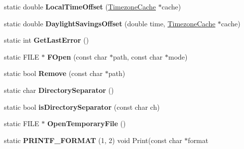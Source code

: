 \begin{DoxyCompactItemize}
\item 
static double {\bfseries Local\+Time\+Offset} (\hyperlink{classv8_1_1base_1_1_timezone_cache}{Timezone\+Cache} $\ast$cache)\hypertarget{classv8_1_1base_1_1_o_s_aa83fa2e91324497a0d9e7879d7232853}{}\label{classv8_1_1base_1_1_o_s_aa83fa2e91324497a0d9e7879d7232853}

\item 
static double {\bfseries Daylight\+Savings\+Offset} (double time, \hyperlink{classv8_1_1base_1_1_timezone_cache}{Timezone\+Cache} $\ast$cache)\hypertarget{classv8_1_1base_1_1_o_s_a080650024e9e33e2be8d296e1591d2d9}{}\label{classv8_1_1base_1_1_o_s_a080650024e9e33e2be8d296e1591d2d9}

\item 
static int {\bfseries Get\+Last\+Error} ()\hypertarget{classv8_1_1base_1_1_o_s_a6dc6ca7fa1417c3b8ae2d70fb19ab023}{}\label{classv8_1_1base_1_1_o_s_a6dc6ca7fa1417c3b8ae2d70fb19ab023}

\item 
static F\+I\+LE $\ast$ {\bfseries F\+Open} (const char $\ast$path, const char $\ast$mode)\hypertarget{classv8_1_1base_1_1_o_s_a847804239d3654d9dc61325fd7a8b195}{}\label{classv8_1_1base_1_1_o_s_a847804239d3654d9dc61325fd7a8b195}

\item 
static bool {\bfseries Remove} (const char $\ast$path)\hypertarget{classv8_1_1base_1_1_o_s_afc81cb4b82d6a51170eb77b2ac4cbd97}{}\label{classv8_1_1base_1_1_o_s_afc81cb4b82d6a51170eb77b2ac4cbd97}

\item 
static char {\bfseries Directory\+Separator} ()\hypertarget{classv8_1_1base_1_1_o_s_aa010f31048d7a2baf7f30973bc5854d0}{}\label{classv8_1_1base_1_1_o_s_aa010f31048d7a2baf7f30973bc5854d0}

\item 
static bool {\bfseries is\+Directory\+Separator} (const char ch)\hypertarget{classv8_1_1base_1_1_o_s_ae9b48025d23fcd0a98f968d90e7107d4}{}\label{classv8_1_1base_1_1_o_s_ae9b48025d23fcd0a98f968d90e7107d4}

\item 
static F\+I\+LE $\ast$ {\bfseries Open\+Temporary\+File} ()\hypertarget{classv8_1_1base_1_1_o_s_a7984e131b66b92c725f30666de50d4e6}{}\label{classv8_1_1base_1_1_o_s_a7984e131b66b92c725f30666de50d4e6}

\item 
static {\bfseries P\+R\+I\+N\+T\+F\+\_\+\+F\+O\+R\+M\+AT} (1, 2) void Print(const char $\ast$format\hypertarget{classv8_1_1base_1_1_o_s_afa68bde0181d52d77a29c110255bf9e2}{}\label{classv8_1_1base_1_1_o_s_afa68bde0181d52d77a29c110255bf9e2}


\end{DoxyCompactItemize}
